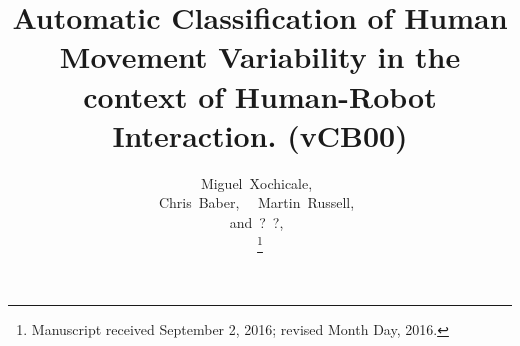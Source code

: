 \documentclass[9pt,journal,onecolumn,compsoc]{IEEEtran}
\begin{document}
%
\title{
  Automatic Classification of  Human Movement Variability  in the context of  Human-Robot Interaction. (vCB00)
}



%
%

\author{
 	Miguel~Xochicale,~\\
         Chris~Baber,~
         ~Martin~Russell,~ \\
         and~?~?,~

\thanks{Manuscript received September 2, 2016; revised Month Day, 2016.}
}
\end{document}
